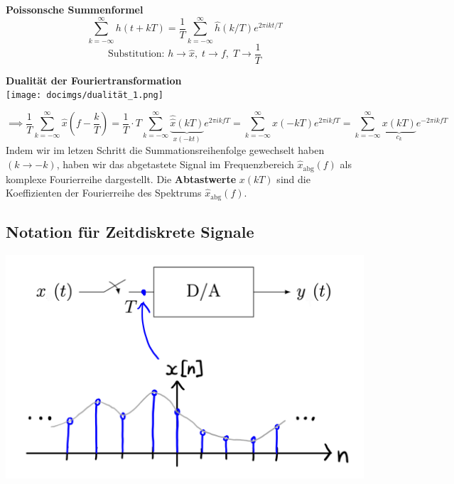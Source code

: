 \documentclass[11pt]{article}
\begin{document}
\noindent
\begin{minipage}[t]{0.48\textwidth} %
    \textbf{Poissonsche Summenformel}\\[0.5em]
    \[
    \sum_{k=-\infty}^\infty h(t + kT) = \frac{1}{T} \sum_{k=-\infty}^\infty \hat{h}(k/T)e^{2 \pi i k t/T}
    \]
    \[
    \text{Substitution: }h \to \hat{x}, \; t \to f, \; T \to \frac{1}{T}
    \]
\end{minipage}
\hfill
\begin{minipage}[t]{0.48\textwidth} %
    \textbf{Dualität der Fouriertransformation}\\[0.5em]
    \texttt{[image: docimgs/dualität\_1.png]}
\end{minipage}

$$\implies \frac{1}{T}\sum_{k=-\infty}^{\infty}\hat{x}\left( f- \frac{k}{T} \right) = \frac{1}{T}\cdot T \sum_{k=-\infty}^{\infty} \underbrace{\hat{\hat{x}}(kT)}_{x(-kt)}e^{2 \pi i k f T} = \sum_{k=-\infty}^\infty x(-kT)e^{2 \pi i k f T} = \sum_{k=-\infty}^\infty \underbrace{x(kT)}_{c_k}e^{-2 \pi i k f T}$$
Indem wir im letzen Schritt die Summationsreihenfolge gewechselt haben $(k \to -k)$, haben wir das abgetastete Signal im Frequenzbereich $\hat{x}_{\text{abg}}(f)$ als komplexe Fourierreihe dargestellt. Die \textbf{Abtastwerte} $x(kT)$ sind die Koeffizienten der Fourierreihe des Spektrums $\hat{x}_{\text{abg}}(f)$.

\subsection*{Notation für Zeitdiskrete Signale}
\vspace*{-0.5cm}

\begin{center}
    \includegraphics[width=0.6\linewidth]{docimgs/abtast.jpg}
\end{center}

\pagebreak
\end{document}
